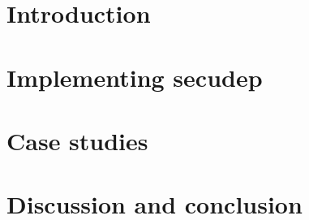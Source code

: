 \documentclass[a4paper,12pt,titlepage]{dithesis}
\begin{document}
\chapter{Introduction}
\sivunumerot{}

\chapter{Implementing secudep}

\chapter{Case studies}

\chapter{Discussion and conclusion}




\end{document}
